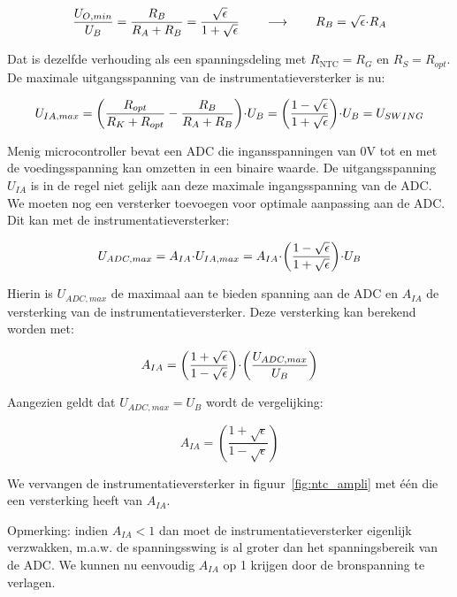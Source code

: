 \documentclass[12pt,a4paper,final,twoside,fleqn]{article}
\newcommand{\rntc}{R_\text{NTC}}
\newcommand{\ropt}{R_{opt}}
\let\oldcdot\cdot
\renewcommand{\cdot}{\kern-.10em\oldcdot\kern-.10em}
\begin{document}
\begin{equation}
\dfrac{U_{O,min}}{U_B} = \dfrac{R_B}{R_A+R_B} = \dfrac{\sqrt{\epsilon}}{1+\sqrt{\epsilon}} \qquad\longrightarrow\qquad R_B = \sqrt{\epsilon}\cdot R_A
\end{equation}

Dat is dezelfde verhouding als een spanningsdeling met $\rntc = R_G$ en
$R_S = \ropt$.
De maximale uitgangsspanning van de instrumentatieversterker is nu:

\begin{equation}
U_{IA,max} = \left( \dfrac{\ropt}{R_K+\ropt} - \dfrac{R_B}{R_A+R_B}\right)\cdot U_B =
\left(\dfrac{1-\sqrt{\epsilon}}{1+\sqrt{\epsilon}}\right)\cdot U_B = U_{SWING}
\end{equation}

Menig microcontroller bevat een ADC die ingansspanningen van 0V tot en met de
voedingsspanning kan omzetten in een binaire waarde. De uitgangsspanning $U_{IA}$
is in de regel niet gelijk aan deze maximale ingangsspanning van de ADC. We moeten
nog een versterker toevoegen voor optimale aanpassing aan de ADC. Dit kan met
de instrumentatieversterker:

\begin{equation}
U_{ADC,max} = A_{IA}\cdot U_{IA,max} = A_{IA}\cdot \left(\dfrac{1-\sqrt{\epsilon}}{1+\sqrt{\epsilon}}\right)\cdot U_B
\end{equation}

Hierin is $U_{ADC,max}$ de maximaal aan te bieden spanning aan de ADC en $A_{IA}$ de
versterking van de instrumentatieversterker. Deze versterking
kan berekend worden met:

\begin{equation}
A_{IA} = \left(\dfrac{1+\sqrt{\epsilon}}{1-\sqrt{\epsilon}}\right)\cdot
\left( \dfrac{U_{ADC,max}}{U_B}\right)
\end{equation}

Aangezien geldt dat $U_{ADC,max} = U_B$ wordt de vergelijking:

\begin{equation}
A_{IA} = \left(\dfrac{1+\sqrt{\epsilon}}{1-\sqrt{\epsilon}}\right)%
\end{equation}


We vervangen de instrumentatieversterker in figuur~\ref{fig:ntc_ampli} met
\'e\'en die een versterking heeft van $A_{IA}$.

Opmerking: indien $A_{IA} < 1$ dan moet de instrumentatieversterker eigenlijk
verzwakken, m.a.w. de spanningsswing is al groter dan het spanningsbereik van
de ADC. We kunnen nu eenvoudig $A_{IA}$ op 1 krijgen door de bronspanning te
verlagen.
\end{document}
